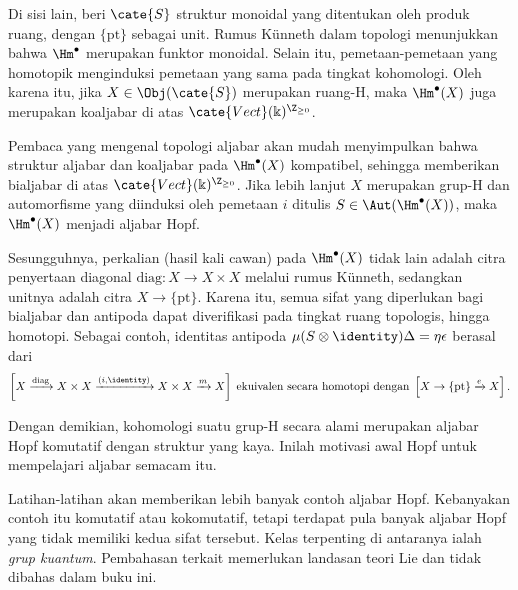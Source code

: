 \begin{example}[H.\ Hopf]
	Di sisi lain, beri $\cate{S}$ struktur monoidal yang ditentukan oleh produk
	ruang, dengan $\{\mathrm{pt}\}$ sebagai unit. Rumus Künneth dalam topologi
	menunjukkan bahwa $\Hm^\bullet$ merupakan funktor monoidal. Selain itu,
	pemetaan-pemetaan yang homotopik menginduksi pemetaan yang sama pada tingkat
	kohomologi. Oleh karena itu, jika $X\in\Obj(\cate{S})$ merupakan ruang-H,
	maka $\Hm^\bullet(X)$ juga merupakan koaljabar di atas
	$\cate{Vect}(\Bbbk)^{\Z_{\geq0}}$.

	Pembaca yang mengenal topologi aljabar akan mudah menyimpulkan bahwa
	struktur aljabar dan koaljabar pada $\Hm^\bullet(X)$ kompatibel, sehingga
	memberikan bialjabar di atas
	$\cate{Vect}(\Bbbk)^{\Z_{\geq0}}$. Jika lebih lanjut $X$ merupakan grup-H
	dan automorfisme yang diinduksi oleh pemetaan $i$ ditulis
	$S\in\Aut(\Hm^\bullet(X))$, maka $\Hm^\bullet(X)$ menjadi aljabar Hopf.

	Sesungguhnya, perkalian (hasil kali cawan) pada $\Hm^\bullet(X)$ tidak lain
	adalah citra penyertaan diagonal
	$\mathrm{diag}:X\to X\times X$ melalui rumus Künneth, sedangkan unitnya
	adalah citra $X\to\{\mathrm{pt}\}$. Karena itu, semua sifat yang
	diperlukan bagi bialjabar dan antipoda dapat diverifikasi pada tingkat ruang
	topologis, hingga homotopi. Sebagai contoh, identitas antipoda
	$\mu(S\otimes\identity)\Delta=\eta\epsilon$ berasal dari
	\[ \left[ X \xrightarrow{\mathrm{diag}} X \times X \xrightarrow{(i, \identity)} X \times X \xrightarrow{m} X\right] \;\text{ekuivalen secara homotopi dengan}\; \left[ X \to \{\mathrm{pt}\} \xrightarrow{e} X \right]. \]

	Dengan demikian, kohomologi suatu grup-H secara alami merupakan aljabar Hopf
	komutatif dengan struktur yang kaya. Inilah motivasi awal Hopf untuk
	mempelajari aljabar semacam itu.
\end{example}

Latihan-latihan akan memberikan lebih banyak contoh aljabar Hopf. Kebanyakan
contoh itu komutatif atau kokomutatif, tetapi terdapat pula banyak aljabar Hopf
yang tidak memiliki kedua sifat tersebut. Kelas terpenting di antaranya ialah
\emph{grup kuantum}. Pembahasan terkait memerlukan landasan teori Lie dan tidak
dibahas dalam buku ini.
